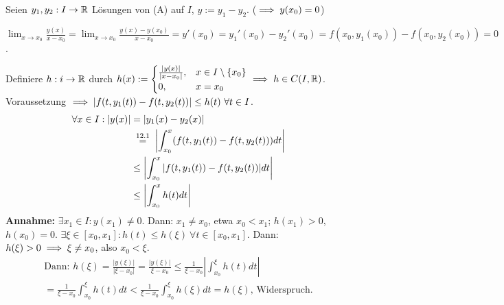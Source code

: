 \documentclass[a4paper,twoside,DIV15,BCOR12mm]{scrbook}
\begin{document}
\begin{beweis}
Seien $y_1,y_2: I \to \mathbb{R}$ Lösungen von (A) auf $I$, $y:= y_1-y_2$. ($\implies y(x_0)=0$)

$\lim_{x\to x_0} \frac{y(x)}{x-x_0} = \lim_{x\to x_0} \frac{y(x) - y(x_0)}{x-x_0} = y'(x_0) = y_1'(x_0) - y_2'(x_0) = f(x_0,y_1(x_0))  - f(x_0,y_2(x_0)) = 0$.

Definiere $h:i\to\mathbb{R}$ durch $h(x) := 
\begin{cases}
\frac{|y(x)|}{|x-x_0|}, & x\in I\setminus\{x_0\}\\
0, &x=x_0
\end{cases} \implies h \in C(I,\mathbb{R})
$. Voraussetzung $\folgt |f(t,y_1(t)) - f(t,y_2(t))| \le h(t) \ \forall t\in I$.
\begin{align*}
\forall x\in I: |y(x)| &=|y_1(x) - y_2(x)| \\
&\gleichnach{12.1} \left|\int_{x_0}^x (f(t,y_1(t)) - f(t,y_2(t))) dt \right| \\
&\le \left| \int_{x_0}^x |f(t,y_1(t)) - f(t,y_2(t))| dt \right| \\
&\le \left|\int_{x_0}^x h(t) dt\right|
\end{align*}
\textbf{Annahme:} $\exists x_1 \in I: y(x_1)\ne0$. Dann: $x_1\ne x_0$, etwa $x_0<x_1$; $h(x_1) >0$, $h(x_0) = 0$. $\exists \xi \in [x_0,x_1]: h(t) \le h(\xi) \ \forall t\in[x_0,x_1]$. Dann: $h(\xi) > 0 \implies \xi \ne x_0$, also $x_0 < \xi$.
\begin{multline*}
\text{Dann: }h(\xi) = \frac{|y(\xi)|}{|\xi-x_0|} = \frac{|y(\xi)|}{\xi-x_0} 
\le \frac1{\xi-x_0} \left|\int_{x_0}^\xi h(t) dt \right|\\ = \frac{1}{\xi-x_0} \int_{x_0}^\xi h(t) dt < \frac1{\xi-x_0} \int_{x_0}^\xi h(\xi) dt = h(\xi)\text{, Widerspruch.}
\end{multline*}
\end{beweis}
\end{document}
